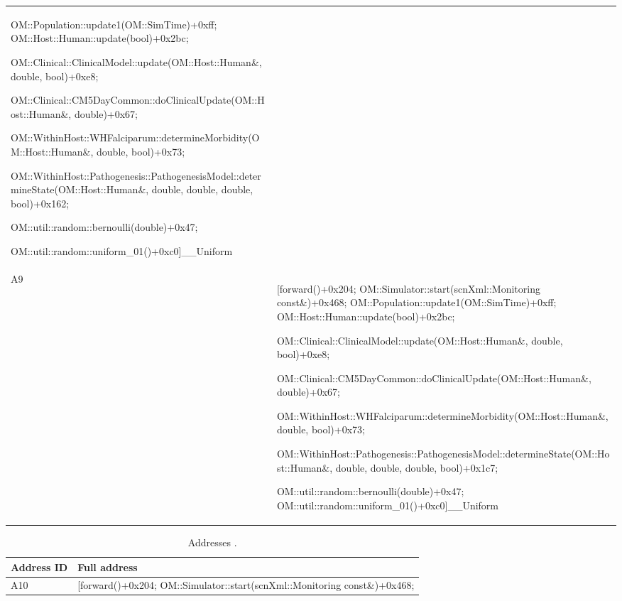 \documentclass{article}
\begin{document}
{\begin{table}[b!]
\begin{tabularx}{\textwidth}{@{}lX@{}}
	OM::Population::update1(OM::SimTime)+0xff; OM::Host::Human::update(bool)+0x2bc;

	OM::Clinical::ClinicalModel::update(OM::Host::Human\&, double, bool)+0xe8;

	OM::Clinical::CM5DayCommon::doClinicalUpdate(OM::Host::Human\&, double)+0x67;

	OM::WithinHost::WHFalciparum::determineMorbidity(OM::Host::Human\&, double, bool)+0x73;

	OM::WithinHost::Pathogenesis::PathogenesisModel::determineState(OM::Host::Human\&, double, double, double, bool)+0x162;

	OM::util::random::bernoulli(double)+0x47;

	OM::util::random::uniform\_01()+0xc0]\_\_Uniform\\
A9 & [forward()+0x204; OM::Simulator::start(scnXml::Monitoring const\&)+0x468;
 OM::Population::update1(OM::SimTime)+0xff; OM::Host::Human::update(bool)+0x2bc;

 OM::Clinical::ClinicalModel::update(OM::Host::Human\&, double, bool)+0xe8;

  OM::Clinical::CM5DayCommon::doClinicalUpdate(OM::Host::Human\&, double)+0x67;

  OM::WithinHost::WHFalciparum::determineMorbidity(OM::Host::Human\&, double, bool)+0x73;

  OM::WithinHost::Pathogenesis::PathogenesisModel::determineState(OM::Host::Human\&, double, double, double, bool)+0x1c7;

  OM::util::random::bernoulli(double)+0x47; OM::util::random::uniform\_01()+0xc0]\_\_Uniform\\
\bottomrule
  \end{tabularx}
  \end{table}

  \begin{table}[ht!]
  \footnotesize
  \setlength{\tabcolsep}{1mm}
  \caption{Addresses .}
  \label{table:addresses}
  \def\arraystretch{1.25}
  \begin{tabularx}{\textwidth}{@{}lX@{}} 
    \toprule
    Address ID & Full address \\
    \midrule
A10 & [forward()+0x204; OM::Simulator::start(scnXml::Monitoring const\&)+0x468;


\end{tabularx}
\end{table}}
\end{document}
